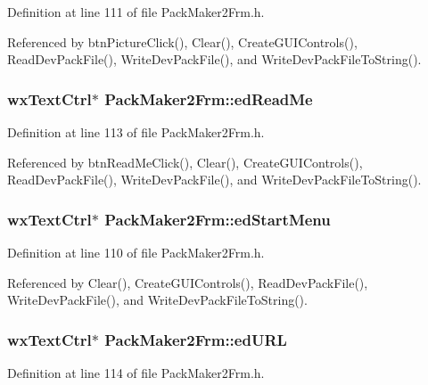 Definition at line 111 of file Pack\-Maker2Frm.h.

Referenced by btn\-Picture\-Click(), Clear(), Create\-GUIControls(), Read\-Dev\-Pack\-File(), Write\-Dev\-Pack\-File(), and Write\-Dev\-Pack\-File\-To\-String().
\subsubsection{\setlength{\rightskip}{0pt plus 5cm}wx\-Text\-Ctrl$\ast$ {\bf Pack\-Maker2Frm::ed\-Read\-Me}\hspace{0.3cm}{\tt  [private]}}\label{class_pack_maker2_frm_0819826fdd35737b8d604d99e84dd8fe}




Definition at line 113 of file Pack\-Maker2Frm.h.

Referenced by btn\-Read\-Me\-Click(), Clear(), Create\-GUIControls(), Read\-Dev\-Pack\-File(), Write\-Dev\-Pack\-File(), and Write\-Dev\-Pack\-File\-To\-String().
\subsubsection{\setlength{\rightskip}{0pt plus 5cm}wx\-Text\-Ctrl$\ast$ {\bf Pack\-Maker2Frm::ed\-Start\-Menu}\hspace{0.3cm}{\tt  [private]}}\label{class_pack_maker2_frm_ad5f887af84ed829bda9390472aa896a}




Definition at line 110 of file Pack\-Maker2Frm.h.

Referenced by Clear(), Create\-GUIControls(), Read\-Dev\-Pack\-File(), Write\-Dev\-Pack\-File(), and Write\-Dev\-Pack\-File\-To\-String().
\subsubsection{\setlength{\rightskip}{0pt plus 5cm}wx\-Text\-Ctrl$\ast$ {\bf Pack\-Maker2Frm::ed\-URL}\hspace{0.3cm}{\tt  [private]}}\label{class_pack_maker2_frm_a7a84720d27ac2beaca4b9421648e0d2}




Definition at line 114 of file Pack\-Maker2Frm.h.


